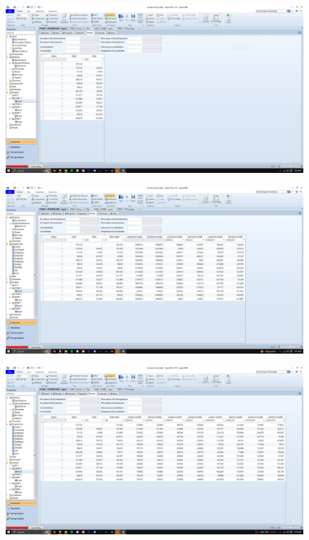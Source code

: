 \documentclass{article}
\begin{document}
\begin{figure}[H]
    \centering
    \includegraphics[width=0.99\textwidth, frame]{img/13 (ptenvelope table).JPG}
\end{figure}

\begin{figure}[H]
    \centering
    \includegraphics[width=0.99\textwidth, frame]{img/14 (propset 1).JPG}
\end{figure}

\begin{figure}[H]
    \centering
    \includegraphics[width=0.99\textwidth, frame]{img/15 (propset2).JPG}
\end{figure}
\end{document}

